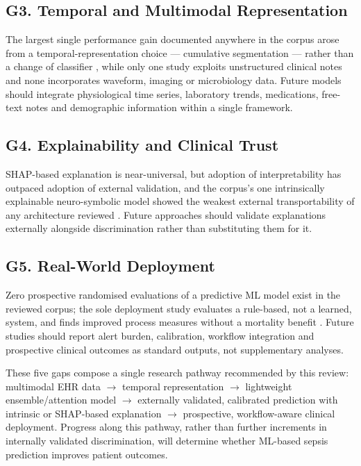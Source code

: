 \documentclass[conference]{IEEEtran}
\begin{document}
\subsection*{G3. Temporal and Multimodal Representation}

The largest single performance gain documented anywhere in the corpus arose from a temporal-representation choice --- cumulative segmentation --- rather than a change of classifier \cite{r33}, while only one study exploits unstructured clinical notes \cite{r22} and none incorporates waveform, imaging or microbiology data. Future models should integrate physiological time series, laboratory trends, medications, free-text notes and demographic information within a single framework.

\subsection*{G4. Explainability and Clinical Trust}

SHAP-based explanation is near-universal, but adoption of interpretability has outpaced adoption of external validation, and the corpus's one intrinsically explainable neuro-symbolic model showed the weakest external transportability of any architecture reviewed \cite{r19}. Future approaches should validate explanations externally alongside discrimination rather than substituting them for it.

\subsection*{G5. Real-World Deployment}

Zero prospective randomised evaluations of a predictive ML model exist in the reviewed corpus; the sole deployment study evaluates a rule-based, not a learned, system, and finds improved process measures without a mortality benefit \cite{r28}. Future studies should report alert burden, calibration, workflow integration and prospective clinical outcomes as standard outputs, not supplementary analyses.

These five gaps compose a single research pathway recommended by this review: multimodal EHR data $\rightarrow$ temporal representation $\rightarrow$ lightweight ensemble/attention model $\rightarrow$ externally validated, calibrated prediction with intrinsic or SHAP-based explanation $\rightarrow$ prospective, workflow-aware clinical deployment. Progress along this pathway, rather than further increments in internally validated discrimination, will determine whether ML-based sepsis prediction improves patient outcomes.
\end{document}
